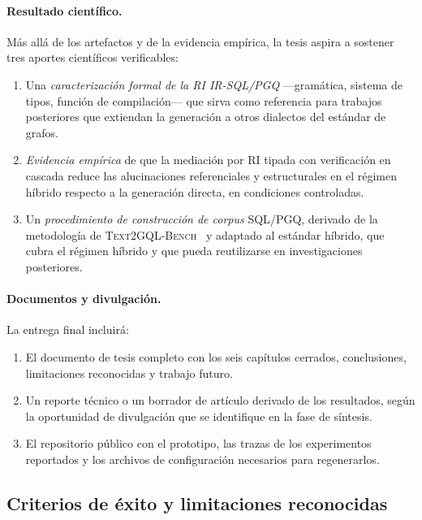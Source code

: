 \paragraph{Resultado científico.} Más allá de los artefactos y de la evidencia empírica, la tesis aspira a sostener tres aportes científicos verificables:

\begin{enumerate}
    \item Una \emph{caracterización formal de la \ac{RI} IR-SQL/PGQ} ---gramática, sistema de tipos, función de compilación--- que sirva como referencia para trabajos posteriores que extiendan la generación a otros dialectos del estándar de grafos.
    \item \emph{Evidencia empírica} de que la mediación por \ac{RI} tipada con verificación en cascada reduce las alucinaciones referenciales y estructurales en el régimen híbrido respecto a la generación directa, en condiciones controladas.
    \item Un \emph{procedimiento de construcción de corpus} \ac{SQL}/\ac{PGQ}, derivado de la metodología de \textsc{Text2GQL-Bench}~\cite{text2gqlbench} y adaptado al estándar híbrido, que cubra el régimen híbrido y que pueda reutilizarse en investigaciones posteriores.
\end{enumerate}

\paragraph{Documentos y divulgación.} La entrega final incluirá:

\begin{enumerate}
    \item El documento de tesis completo con los seis capítulos cerrados, conclusiones, limitaciones reconocidas y trabajo futuro.
    \item Un reporte técnico o un borrador de artículo derivado de los resultados, según la oportunidad de divulgación que se identifique en la fase de síntesis.
    \item El repositorio público con el prototipo, las trazas de los experimentos reportados y los archivos de configuración necesarios para regenerarlos.
\end{enumerate}

\subsection{Criterios de éxito y limitaciones reconocidas}
\label{subsec:prop-criterios}

